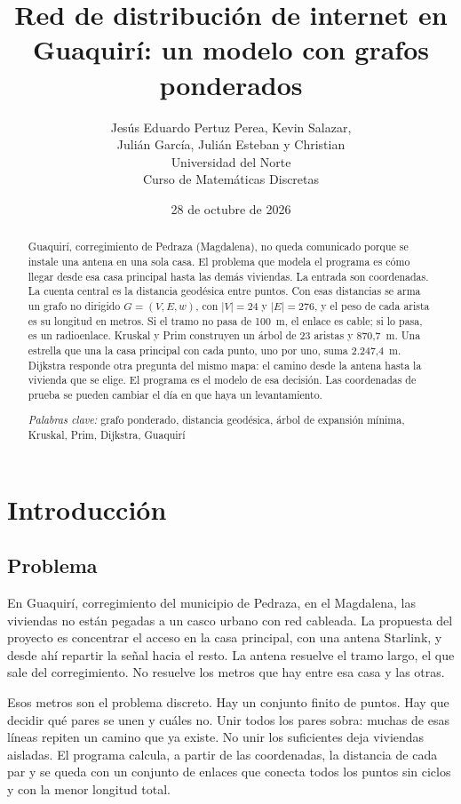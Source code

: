 \documentclass[12pt,a4paper]{article}
\title{Red de distribución de internet en Guaquirí: un modelo con grafos ponderados}
\author{Jesús Eduardo Pertuz Perea, Kevin Salazar,\\
Julián García, Julián Esteban y Christian\\[0.4em]
Universidad del Norte\\
Curso de Matemáticas Discretas}
\date{28 de octubre de 2026}
\begin{document}
\maketitle

\begin{abstract}
\noindent
Guaquirí, corregimiento de Pedraza (Magdalena), no queda comunicado porque se instale una antena en una sola casa. El problema que modela el programa es cómo llegar desde esa casa principal hasta las demás viviendas. La entrada son coordenadas. La cuenta central es la distancia geodésica entre puntos. Con esas distancias se arma un grafo no dirigido \(G=(V,E,w)\), con \(|V|=24\) y \(|E|=276\), y el peso de cada arista es su longitud en metros. Si el tramo no pasa de 100~m, el enlace es cable; si lo pasa, es un radioenlace. Kruskal y Prim construyen un árbol de 23 aristas y 870,7~m. Una estrella que una la casa principal con cada punto, uno por uno, suma 2.247,4~m. Dijkstra responde otra pregunta del mismo mapa: el camino desde la antena hasta la vivienda que se elige. El programa es el modelo de esa decisión. Las coordenadas de prueba se pueden cambiar el día en que haya un levantamiento.

\vspace{0.6em}
\noindent\textit{Palabras clave:} grafo ponderado, distancia geodésica, árbol de expansión mínima, Kruskal, Prim, Dijkstra, Guaquirí
\end{abstract}

\section{Introducción}

\subsection{Problema}

En Guaquirí, corregimiento del municipio de Pedraza, en el Magdalena, las viviendas no están pegadas a un casco urbano con red cableada. La propuesta del proyecto es concentrar el acceso en la casa principal, con una antena Starlink, y desde ahí repartir la señal hacia el resto. La antena resuelve el tramo largo, el que sale del corregimiento. No resuelve los metros que hay entre esa casa y las otras.

Esos metros son el problema discreto. Hay un conjunto finito de puntos. Hay que decidir qué pares se unen y cuáles no. Unir todos los pares sobra: muchas de esas líneas repiten un camino que ya existe. No unir los suficientes deja viviendas aisladas. El programa calcula, a partir de las coordenadas, la distancia de cada par y se queda con un conjunto de enlaces que conecta todos los puntos sin ciclos y con la menor longitud total.
\end{document}
